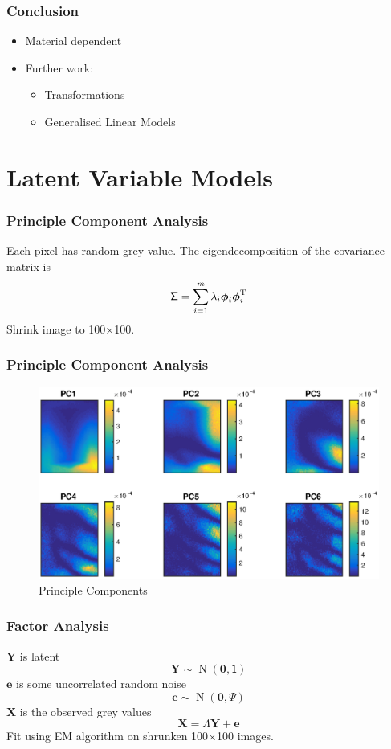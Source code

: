 \documentclass{beamer}
\DeclareMathOperator{\normal}{N}
\newcommand{\T}{^\textup{T}}
\newcommand{\vect}[1]{\mathbf{#1}}
\newcommand{\vectGreek}[1]{\boldsymbol{#1}}
\newcommand{\matr}[1]{\mathsf{#1}}
\begin{document}
\begin{frame}
\frametitle{Conclusion}
\begin{itemize}
	\item Material dependent
	\item Further work:
		\begin{itemize}
			\item Transformations
			\item Generalised Linear Models
		\end{itemize}
\end{itemize}
\end{frame}


\section{Latent Variable Models}

\begin{frame}
\frametitle{Principle Component Analysis}
Each pixel has random grey value. The eigendecomposition of the covariance matrix is
\begin{equation}
\matr{\Sigma} = \sum_{i=1}^{m} \lambda_i \vectGreek{\phi}_i \vectGreek{\phi}_i\T
\end{equation}
Shrink image to 100$\times$100.
\end{frame}

\begin{frame}
\frametitle{Principle Component Analysis}
\begin{figure}
	\includegraphics[width=\textwidth]{figures/initial_PCvariance.eps}
	\caption{Principle Components}
\end{figure}
\end{frame}

\begin{frame}
\frametitle{Factor Analysis}
$\vect{Y}$ is latent
\begin{equation}
\vect{Y}\sim\normal\left(\vect{0},\matr{1}\right)
\end{equation}
$\vect{e}$ is some uncorrelated random noise
\begin{equation}
\vect{e}\sim\normal\left(\vect{0},\matr{\Psi}\right)
\end{equation}
$\vect{X}$ is the observed grey values
\begin{equation}
\vect{X}=\matr{\Lambda}\vect{Y}+\vect{e}
\end{equation}
Fit using EM algorithm on shrunken 100$\times$100 images.
\end{frame}
\end{document}

